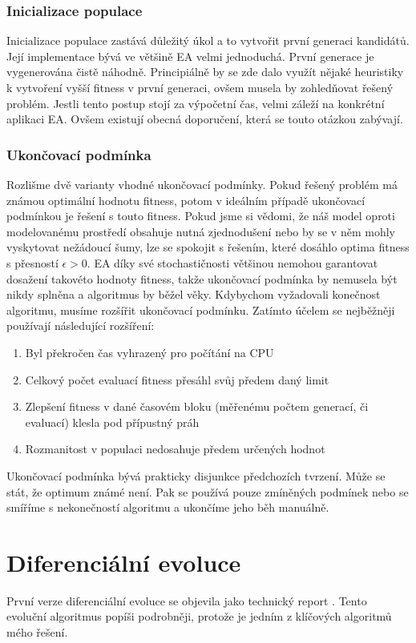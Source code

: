 \subsubsection{Inicializace populace}
Inicializace populace zastává důležitý úkol a to vytvořit první generaci kandidátů. Její implementace bývá ve většině EA velmi jednoduchá. První generace je vygenerována čistě náhodně. Principiálně by se zde dalo využít nějaké heuristiky k vytvoření vyšší fitness v první generaci, ovšem musela by zohledňovat řešený problém. Jestli tento postup stojí za výpočetní čas, velmi záleží na konkrétní aplikaci EA. Ovšem existují obecná doporučení, která se touto otázkou zabývají. 
\subsubsection{Ukončovací podmínka}
Rozlišme dvě varianty vhodné ukončovací podmínky. Pokud řešený problém má známou optimální hodnotu fitness, potom v ideálním případě ukončovací podmínkou je řešení s touto fitness. Pokud jsme si vědomi, že náš model oproti modelovanému prostředí obsahuje nutná zjednodušení nebo by se v něm mohly vyskytovat nežádoucí šumy, lze se spokojit s řešením, které dosáhlo optima fitness s přesností $\epsilon > 0$. EA díky své stochastičnosti většinou nemohou garantovat dosažení takovéto hodnoty fitness, takže ukončovací podmínka by nemusela být nikdy splněna a algoritmus by běžel věky. Kdybychom vyžadovali konečnost algoritmu, musíme rozšířit ukončovací podmínku. Zatímto účelem se nejběžněji používají následující rozšíření: \par
\begin{enumerate}
\item Byl překročen čas vyhrazený pro počítání na CPU
\item Celkový počet evaluací fitness přesáhl svůj předem daný limit 
\item Zlepšení fitness v dané časovém bloku (měřenému počtem generací, či evaluací) klesla pod přípustný práh
\item Rozmanitost v populaci nedosahuje předem určených hodnot
\end{enumerate}
Ukončovací podmínka bývá prakticky disjunkce předchozích tvrzení. Může se stát, že optimum známé není. Pak se používá pouze zmíněných podmínek nebo se smíříme s nekonečností algoritmu a ukončíme jeho běh manuálně.

\section{Diferenciální evoluce}
\label{sec:DE}
První verze diferenciální evoluce se objevila jako technický report \cite{storn1997differential}. Tento evoluční algoritmus popíši podrobněji, protože je jedním z klíčových algoritmů mého řešení.
